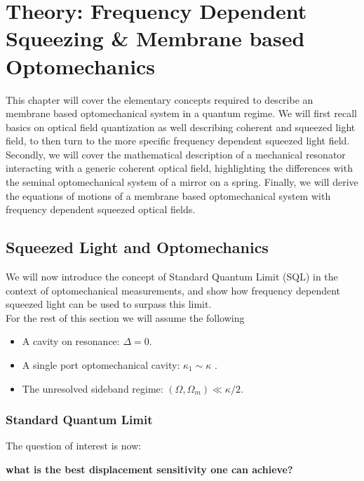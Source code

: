 \chapter{Theory: Frequency Dependent Squeezing \& Membrane based Optomechanics}
This chapter will cover the elementary concepts required to describe an membrane based optomechanical system in a quantum regime. We will first recall basics on optical field quantization as well describing coherent and squeezed light field, to then turn to the more specific frequency dependent squeezed light field. Secondly, we will cover the mathematical description of a mechanical resonator interacting with a generic coherent optical field, highlighting the differences with the seminal optomechanical system of a mirror on a spring. Finally, we will derive the equations of motions of a membrane based optomechanical system with frequency dependent squeezed optical fields. 
\newpage
\minitoc
\newpage


\section{Squeezed Light and Optomechanics}

We will now introduce the concept of Standard Quantum Limit (SQL) in the context of optomechanical measurements, and show how frequency dependent squeezed light can be used to surpass this limit. \\ 

For the rest of this section we will assume the following
\begin{itemize}
  \item A cavity on resonance: $\Delta=0$.
  \item A single port optomechanical cavity: $\kappa_1 \sim \kappa$ .
  \item The unresolved sideband regime: $(\Omega, \Omega_m) \ll \kappa/2$.
\end{itemize}
\subsection{Standard Quantum Limit}
The question of interest is now:
\begin{center}
  \textbf{what is the best displacement sensitivity one can achieve?}
\end{center}  

